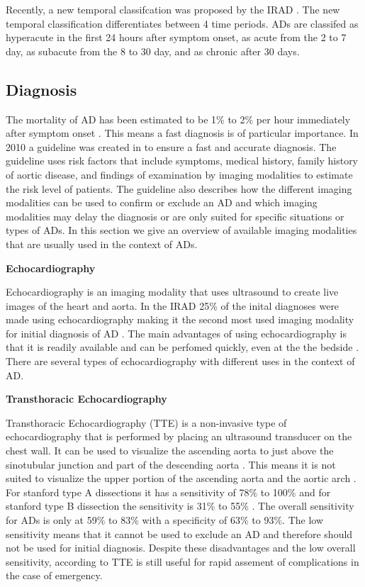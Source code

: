 \documentclass[thesis.tex]{subfiles}
\begin{document}
Recently, a new temporal classifcation was proposed by the IRAD \cite{doi:10.1161/CIRCULATIONAHA.117.031264}. The new temporal classification differentiates between 4 time periods. ADs are classifed as hyperacute in the first 24 hours after symptom onset, as acute from the 2 to 7 day, as subacute from the 8 to 30 day, and as chronic after 30 days.  

\subsection{Diagnosis}
The mortality of AD has been estimated to be 1\% to 2\% per hour immediately after symptom onset \cite{doi:10.1161/CIRCULATIONAHA.117.031264,meszaros2000epidemiology,goldfinger2014thoracic}. This means a fast diagnosis is of particular importance. In 2010 a guideline was created in \cite{hiratzka20102010} to ensure a fast and accurate diagnosis. The guideline uses risk factors that include symptoms, medical history, family history of aortic disease, and findings of examination by imaging modalities to estimate the risk level of patients. The guideline also describes how the different imaging modalities can be used to confirm or exclude an AD and which imaging modalities may delay the diagnosis or are only suited for specific situations or types of ADs. In this section we give an overview of available imaging modalities that are usually used in the context of ADs.

\textbf{Echocardiography}

Echocardiography is an imaging modality that uses ultrasound to create live images of the heart and aorta. In the IRAD 25\% of the inital diagnoses were made using echocardiography making it the second most used imaging modality for initial diagnosis of AD \cite{doi:10.1161/CIRCULATIONAHA.117.031264}. The main advantages of using echocardiography is that it is readily available and can be perfomed quickly, even at the the bedside \cite{baliga2014role}. There are several types of echocardiography with different uses in the context of AD.

\textbf{Transthoracic Echocardiography}

Transthoracic Echocardiography (TTE) is a non-invasive type of echocardiography that is performed by placing an ultrasound transducer on the chest wall. It can be used to visualize the ascending aorta to just above the sinotubular junction and part of the descending aorta \cite{baliga2014role}. This means it is not suited to visualize the upper portion of the ascending aorta and the aortic arch \cite{baliga2014role}. For stanford type A dissections it has a sensitivity of 78\% to 100\% and for stanford type B dissection the sensitivity is 31\% to 55\% \cite{baliga2014role}. The overall sensitivity for ADs is only at 59\% to 83\% with a specificity of 63\% to 93\%. The low sensitivity means that it cannot be used to exclude an AD and therefore should not be used for initial diagnosis. Despite these disadvantages and the low overall sensitivity, according to \cite{baliga2014role} TTE is still useful for rapid assement of complications in the case of emergency. 
\end{document}
